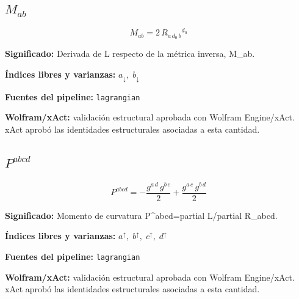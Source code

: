 \documentclass[11pt]{article}
\begin{document}
\subsection*{$ M_{ab} $}
\begin{dmath*}[breakdepth={5}]
M_{ab} = 2\,R{}_{a\,d_{0}\,b}{}^{d_{0}}
\end{dmath*}
\par\vspace{1.2\baselineskip}\noindent
\begin{minipage}{\linewidth}
\textbf{Significado:} Derivada de L respecto de la métrica inversa, M\_ab.\par
\textbf{Índices libres y varianzas:} $ a_{\downarrow},\;b_{\downarrow} $\par
\textbf{Fuentes del pipeline:} \texttt{lagrangian}\par
\textbf{Wolfram/xAct:} validación estructural aprobada con Wolfram Engine/xAct. xAct aprobó las identidades estructurales asociadas a esta cantidad.\par
\end{minipage}
\subsection*{$ P^{abcd} $}
\begin{dmath*}[breakdepth={5}]
P^{abcd} = -\frac{g{}^{a\,d}\,g{}^{b\,c}}{2} + \frac{g{}^{a\,c}\,g{}^{b\,d}}{2}
\end{dmath*}
\par\vspace{1.2\baselineskip}\noindent
\begin{minipage}{\linewidth}
\textbf{Significado:} Momento de curvatura P^{abcd}=partial L/partial R\_abcd.\par
\textbf{Índices libres y varianzas:} $ a^{\uparrow},\;b^{\uparrow},\;c^{\uparrow},\;d^{\uparrow} $\par
\textbf{Fuentes del pipeline:} \texttt{lagrangian}\par
\textbf{Wolfram/xAct:} validación estructural aprobada con Wolfram Engine/xAct. xAct aprobó las identidades estructurales asociadas a esta cantidad.\par
\end{minipage}
\end{document}
